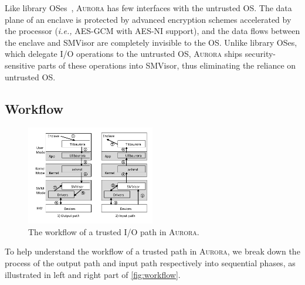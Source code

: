 Like library OSes~\cite{DBLP:journals/tocs/BaumannPH15, DBLP:conf/usenix/TsaiPV17, shinde_panoply:_2017}, \textsc{Aurora} has few interfaces with the untrusted OS. %
The data plane of an enclave is protected by advanced encryption schemes accelerated by the processor (\emph{i.e.,} AES-GCM with AES-NI support), and the data flows between the enclave and SMVisor are completely invisible to the OS. Unlike library OSes, which delegate I/O operations to the untrusted OS, \textsc{Aurora} ships security-sensitive parts of these operations into SMVisor, thus eliminating the reliance on untrusted OS.

\subsection{Workflow}\label{workflow}

\begin{figure}
	\centering
	\includegraphics[width=0.5\textwidth]{figures/workflow.pdf} %
	\caption{The workflow of a trusted I/O path in \textsc{Aurora}. }%
	\label{fig:workflow}
\end{figure}

To help understand the workflow of a trusted path in \textsc{Aurora}, we break down the process of the output path and input path respectively into sequential phases, as illustrated in left and right part of \autoref{fig:workflow}.

